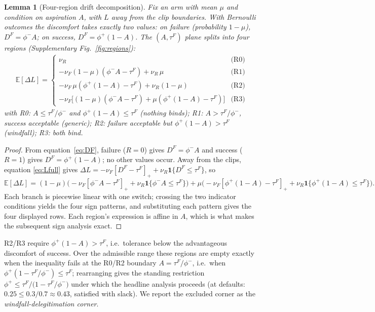 \documentclass[11pt]{article}
\newtheorem{lemma}{Lemma}[section]
\newcommand{\E}{\mathbb{E}}
\newcommand{\1}{\mathbf{1}}
\newcommand{\prov}[1]{\par\vspace{1pt}{\footnotesize\color{black!60}\textsf{\textbf{Verification:} #1}}\par\vspace{2pt}}
\begin{document}
\begin{lemma}[Four-region drift decomposition]
\label{l:regions}
Fix an arm with mean $\mu$ and condition on aspiration $A$, with $L$ away from the clip
boundaries. With Bernoulli outcomes the discomfort takes exactly two values: on failure
(probability $1-\mu$), $D^F=\phi^-A$; on success, $D^F=\phi^+(1-A)$. The $(A,\tau^F)$
plane splits into four regions (Supplementary Fig.~\ref{fig:regions}):
\begin{align}
\E[\Delta L]=
\begin{cases}
\nu_R & \text{(R0)}\\[2pt]
-\nu_F(1-\mu)(\phi^-A-\tau^F)+\nu_R\,\mu & \text{(R1)}\\[2pt]
-\nu_F\,\mu(\phi^+(1-A)-\tau^F)+\nu_R(1-\mu) & \text{(R2)}\\[2pt]
-\nu_F\big[(1-\mu)(\phi^-A-\tau^F)+\mu(\phi^+(1-A)-\tau^F)\big] & \text{(R3)}
\end{cases}
\label{eq:regions}
\end{align}
with R0: $A\le\tau^F\!/\phi^-$ and $\phi^+(1-A)\le\tau^F$ (nothing binds); R1: $A>\tau^F\!/\phi^-$, success acceptable (generic); R2: failure acceptable but $\phi^+(1-A)>\tau^F$ (windfall); R3: both bind.
\end{lemma}
\prov{Proved here.}
\begin{proof}
From equation~\eqref{eq:DF}, failure ($R=0$) gives $D^F=\phi^-A$ and success ($R=1$)
gives $D^F=\phi^+(1-A)$; no other values occur. Away from the clips, equation
\eqref{eq:Lfull} gives $\Delta L=-\nu_F[D^F-\tau^F]_+ +\nu_R\1\{D^F\le\tau^F\}$, so
\begin{equation*}
\E[\Delta L]=(1-\mu)\big(-\nu_F[\phi^-A-\tau^F]_+ +\nu_R\1\{\phi^-A\le\tau^F\}\big)
+\mu\big(-\nu_F[\phi^+(1-A)-\tau^F]_+ +\nu_R\1\{\phi^+(1-A)\le\tau^F\}\big).
\end{equation*}
Each branch is piecewise linear with one switch; crossing the two indicator conditions
yields the four sign patterns, and substituting each pattern gives the four displayed
rows. Each region's expression is affine in $A$, which is what makes the subsequent sign
analysis exact.
\end{proof}

R2/R3 require $\phi^+(1-A)>\tau^F$, i.e.\ tolerance below the advantageous discomfort of success. Over the admissible range these regions are empty exactly when the inequality fails at the R0/R2 boundary $A=\tau^F/\phi^-$, i.e.\ when $\phi^+(1-\tau^F/\phi^-)\le\tau^F$; rearranging gives the standing restriction $\phi^+\le\tau^F\big/\big(1-\tau^F/\phi^-\big)$ under which the headline analysis proceeds (at defaults: $0.25\le 0.3/0.7\approx0.43$, satisfied with slack). We report the excluded corner as the \emph{windfall-delegitimation corner}.
\end{document}
